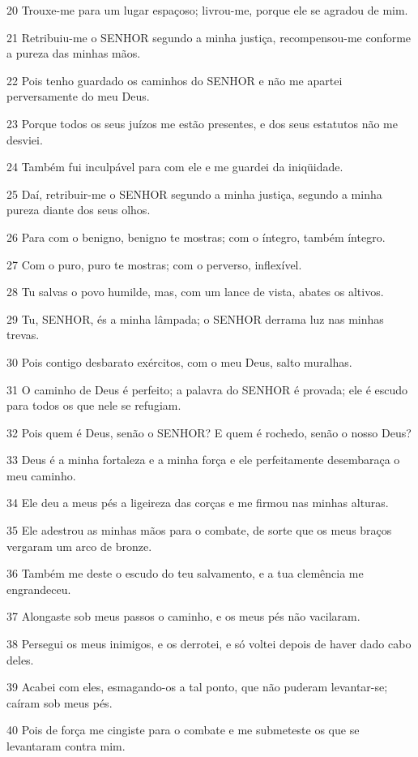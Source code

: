 \par 20 Trouxe-me para um lugar espaçoso; livrou-me, porque ele se agradou de mim.
\par 21 Retribuiu-me o SENHOR segundo a minha justiça, recompensou-me conforme a pureza das minhas mãos.
\par 22 Pois tenho guardado os caminhos do SENHOR e não me apartei perversamente do meu Deus.
\par 23 Porque todos os seus juízos me estão presentes, e dos seus estatutos não me desviei.
\par 24 Também fui inculpável para com ele e me guardei da iniqüidade.
\par 25 Daí, retribuir-me o SENHOR segundo a minha justiça, segundo a minha pureza diante dos seus olhos.
\par 26 Para com o benigno, benigno te mostras; com o íntegro, também íntegro.
\par 27 Com o puro, puro te mostras; com o perverso, inflexível.
\par 28 Tu salvas o povo humilde, mas, com um lance de vista, abates os altivos.
\par 29 Tu, SENHOR, és a minha lâmpada; o SENHOR derrama luz nas minhas trevas.
\par 30 Pois contigo desbarato exércitos, com o meu Deus, salto muralhas.
\par 31 O caminho de Deus é perfeito; a palavra do SENHOR é provada; ele é escudo para todos os que nele se refugiam.
\par 32 Pois quem é Deus, senão o SENHOR? E quem é rochedo, senão o nosso Deus?
\par 33 Deus é a minha fortaleza e a minha força e ele perfeitamente desembaraça o meu caminho.
\par 34 Ele deu a meus pés a ligeireza das corças e me firmou nas minhas alturas.
\par 35 Ele adestrou as minhas mãos para o combate, de sorte que os meus braços vergaram um arco de bronze.
\par 36 Também me deste o escudo do teu salvamento, e a tua clemência me engrandeceu.
\par 37 Alongaste sob meus passos o caminho, e os meus pés não vacilaram.
\par 38 Persegui os meus inimigos, e os derrotei, e só voltei depois de haver dado cabo deles.
\par 39 Acabei com eles, esmagando-os a tal ponto, que não puderam levantar-se; caíram sob meus pés.
\par 40 Pois de força me cingiste para o combate e me submeteste os que se levantaram contra mim.
